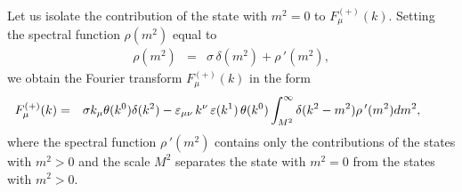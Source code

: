 \documentclass[a4paper,12pt] {article}
\begin{document}
Let us isolate the contribution of the state with $m^2 = 0$ to
$F^{(+)}_{\mu}(k)$.  Setting the spectral function $\rho(m^2)$ equal
to
%
\begin{eqnarray}\label{label4.6}
\rho(m^2) &=& \sigma\,\delta(m^2) + \rho\,'(m^2),
\end{eqnarray}
%
we obtain the Fourier transform $F^{(+)}_{\mu}(k)$ in the form
%
\begin{eqnarray}\label{label4.7}
\hspace{-0.3in}F^{(+)}_{\mu}(k)
&=&\sigma k_{\mu} \theta(k^0) \delta(k^2) -
\varepsilon_{\mu\nu}\,k^{\nu}\,\varepsilon(k^1)\,
\theta(k^0)\int^{\infty}_{M^2} \delta(k^2 -
m^2) \rho\,'(m^2)dm^2,
\end{eqnarray}
%
where the spectral function $\rho\,'(m^2)$
contains only the contributions of the states with $m^2 > 0$ and the
scale $M^2$ separates the state with $m^2 = 0$ from the states with
$m^2 > 0$.
\end{document}
